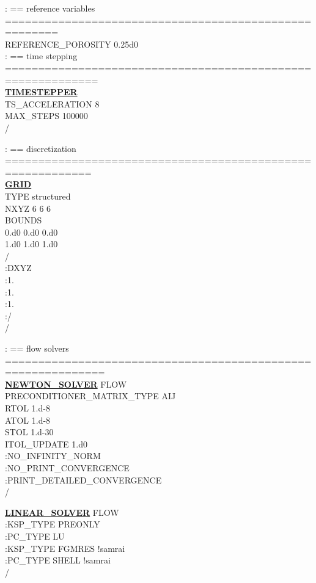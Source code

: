 \noindent
: == reference variables ======================================================\\
REFERENCE\_POROSITY 0.25d0\\

\noindent
: == time stepping ============================================================\\
\hyperlink{target_timestep}{\bf TIMESTEPPER}\\
TS\_ACCELERATION 8\\
MAX\_STEPS 100000\\
/

\noindent
: == discretization ===========================================================\\
\hyperlink{target_grid}{\bf GRID}\\
TYPE structured\\
NXYZ 6 6 6\\
BOUNDS\\
0.d0 0.d0 0.d0\\
1.d0 1.d0 1.d0\\
/\\
:DXYZ\\
:1.\\
:1.\\
:1.\\
:/\\
/

\noindent
: == flow solvers =============================================================\\
\hyperlink{target_newt}{\bf NEWTON\_SOLVER} FLOW\\
PRECONDITIONER\_MATRIX\_TYPE AIJ\\
RTOL 1.d-8\\
ATOL 1.d-8\\
STOL 1.d-30\\
ITOL\_UPDATE 1.d0\\
:NO\_INFINITY\_NORM\\
:NO\_PRINT\_CONVERGENCE\\
:PRINT\_DETAILED\_CONVERGENCE\\
/

\noindent
\hyperlink{target_linsolv}{\bf LINEAR\_SOLVER} FLOW\\
:KSP\_TYPE PREONLY\\
:PC\_TYPE LU\\
:KSP\_TYPE FGMRES !samrai\\
:PC\_TYPE SHELL !samrai\\
/


